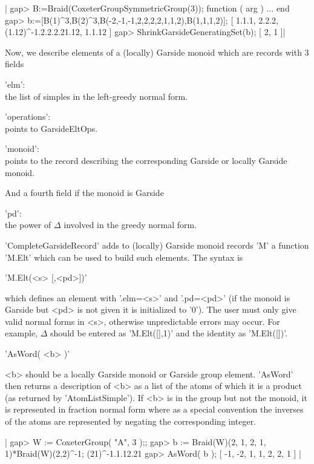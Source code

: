 |    gap> B:=Braid(CoxeterGroupSymmetricGroup(3));
    function ( arg ) ... end
    gap> b:=[B(1)^3,B(2)^3,B(-2,-1,-1,2,2,2,2,1,1,2),B(1,1,1,2)];
    [ 1.1.1, 2.2.2, (1.12)^-1.2.2.2.21.12, 1.1.12 ]
    gap>  ShrinkGarsideGeneratingSet(b);
    [ 2, 1 ]|


Now,  we describe elements of a  (locally) Garside monoid which are records
with 3 fields\:

'elm':\\ the list of simples in the left-greedy normal form.

'operations':\\ points to GarsideEltOps.

'monoid':\\  points to the  record describing the  corresponding Garside or
locally Garside monoid.

And a fourth field if the monoid is Garside\:

'pd':\\ the power of $\Delta$ involved in the greedy normal form.

'CompleteGarsideRecord'  adds  to  (locally)  Garside  monoid records 'M' a
function 'M.Elt' which can be used to build such elements. The syntax is

'M.Elt(<s> [,<pd>])'

which  defines an element with '.elm=<s>'  and '.pd=<pd>' (if the monoid is
Garside but <pd> is not given it is initialized to '0'). The user must only
give  valid normal forms in <s>,  otherwise unpredictable errors may occur.
For  example, $\Delta$ should be entered  as 'M.Elt([],1)' and the identity
as 'M.Elt([])'.


'AsWord( <b> )'

<b>  should be a locally Garside  monoid or Garside group element. 'AsWord'
then  returns a description of <b> as a list  of the atoms of which it is a
product  (as returned by 'AtomListSimple'). If <b>  is in the group but not
the  monoid, it is represented  in fraction normal form  where as a special
convention  the  inverses  of  the  atoms  are  represented by negating the
corresponding integer.

|    gap>  W := CoxeterGroup( "A", 3 );;
    gap>  b := Braid(W)(2, 1, 2, 1, 1)*Braid(W)(2,2)^-1;
    (21)^-1.1.12.21
    gap> AsWord( b );
    [ -1, -2, 1, 1, 2, 2, 1 ]   |

